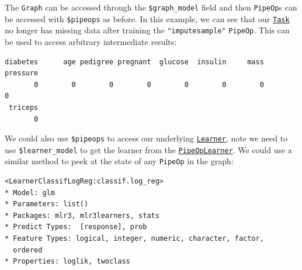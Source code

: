 The \texttt{Graph} can be accessed through the \texttt{\$graph\_model}
field and then \texttt{PipeOp}s can be accessed with \texttt{\$pipeops}
as before. In this example, we can see that our
\href{https://mlr3.mlr-org.com/reference/Task.html}{\texttt{Task}} no
longer has missing data after training the \texttt{"imputesample"}
\texttt{PipeOp}. This can be used to access arbitrary intermediate
results:

\begin{Shaded}
\begin{Highlighting}[]
\OtherTok{=}\SpecialCharTok{$}\SpecialCharTok{$}\SpecialCharTok{$}\SpecialCharTok{$}
\NormalTok{imputesample\_output[[}\NormalTok{]]}\SpecialCharTok{$}\NormalTok{()}
\end{Highlighting}
\end{Shaded}

\begin{verbatim}
diabetes      age pedigree pregnant  glucose  insulin     mass pressure 
       0        0        0        0        0        0        0        0 
 triceps 
       0 
\end{verbatim}

We could also use \texttt{\$pipeops} to access our underlying
\href{https://mlr3.mlr-org.com/reference/Learner.html}{\texttt{Learner}},
note we need to use \texttt{\$learner\_model} to get the learner from
the
\href{https://mlr3pipelines.mlr-org.com/reference/mlr_pipeops_learner.html}{\texttt{PipeOpLearner}}.
We could use a similar method to peek at the state of any
\texttt{PipeOp} in the graph:

\begin{Shaded}
\begin{Highlighting}[]
\OtherTok{=}\SpecialCharTok{$}\SpecialCharTok{$}\SpecialCharTok{$}
\OtherTok{=}\SpecialCharTok{$}
\end{Highlighting}
\end{Shaded}

\begin{verbatim}
<LearnerClassifLogReg:classif.log_reg>
* Model: glm
* Parameters: list()
* Packages: mlr3, mlr3learners, stats
* Predict Types:  [response], prob
* Feature Types: logical, integer, numeric, character, factor,
  ordered
* Properties: loglik, twoclass
\end{verbatim}

